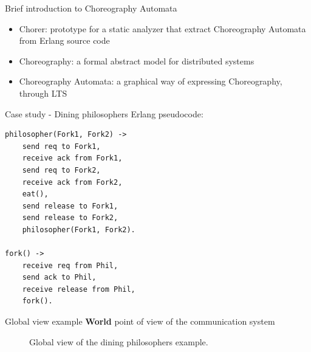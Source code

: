 \documentclass{beamer}
\begin{document}
\begin{frame}{Brief introduction to Choreography Automata}

\begin{itemize}
    \item Chorer: prototype for a static analyzer that extract Choreography 
    Automata from Erlang source code
    \bigskip
    \item Choreography: a formal abstract model for distributed systems
    \bigskip
    \item Choreography Automata: a graphical way of expressing Choreography,
    through LTS
\end{itemize}
\end{frame}

\begin{frame}[fragile]{Case study - Dining philosophers}
Erlang pseudocode:
\begin{verbatim}
philosopher(Fork1, Fork2) ->
    send req to Fork1,
    receive ack from Fork1,
    send req to Fork2,
    receive ack from Fork2,
    eat(),
    send release to Fork1,
    send release to Fork2,
    philosopher(Fork1, Fork2).

fork() ->
    receive req from Phil,
    send ack to Phil,
    receive release from Phil,
    fork().
\end{verbatim}
\end{frame}


\begin{frame}{Global view example}
\textbf{World} point of view of the communication system

\bigskip

\begin{figure}[t]
\centering
\caption{Global view of the dining philosophers example.}
\label{graph:philoglobal}
\end{figure}
\end{frame}
\end{document}
